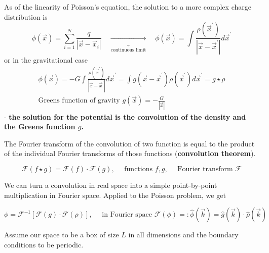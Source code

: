 As of the linearity of Poisson's equation, the solution to a more complex charge distribution is
\begin{equation}
    \phi(\vec{x})=\sum_{i=1}^N \frac{q}{\left|\vec{x}-\vec{x}_i\right|} \quad \underbrace{\rightarrow}_{\text{continuous limit}} \quad \phi(\vec{x})=\int \frac{\rho\left(\vec{x}^{\prime}\right)}{\left|\vec{x}-\vec{x}^{\prime}\right|} d \vec{x}^{\prime}
\end{equation}
or in the gravitational case
\begin{equation}
    \begin{gathered}
        \phi(\vec{x})=-G \int \frac{\rho\left(\vec{x}^{\prime}\right)}{\left|\vec{x}-\vec{x}^{\prime}\right|} d \vec{x}^{\prime}=\int g\left(\vec{x}-\vec{x}^{\prime}\right) \rho\left(\vec{x}^{\prime}\right) d \vec{x}^{\prime}=g \star \rho \\
        \text{Greens function of gravity } g(\vec{x}) = -\frac{G}{|\vec{x}|}
    \end{gathered}
\end{equation}
- \textbf{the solution for the potential is the convolution of the density and the Greens function $g$.}

The Fourier transform of the convolution of two function is equal to the product
of the individual Fourier transforms of those functions (\textbf{convolution theorem}).

\begin{equation}
    \mathcal{F}(f \star g)=\mathcal{F}(f) \cdot \mathcal{F}(g), \quad \text { functions } f, g, \quad \text { Fourier transform } \mathcal{F}
\end{equation}

We can turn a convolution in real space into a simple point-by-point multiplication in Fourier space. Applied
to the Poisson problem, we get

\begin{equation}
    \phi=\mathcal{F}^{-1}[\mathcal{F}(g) \cdot \mathcal{F}(\rho)], \quad \text { in Fourier space } \mathcal{F}(\phi)=: \hat{\phi}(\vec{k})=\hat{g}(\vec{k}) \cdot \hat{\rho}(\vec{k})
\end{equation}


Assume our space to be a box of size $L$ in all dimensions and the boundary conditions to be periodic.

